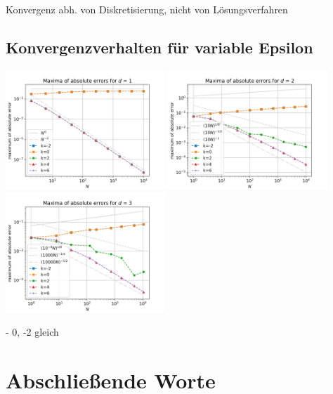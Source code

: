 \documentclass{scrartcl}
\begin{document}
Konvergenz abh. von Diskretisierung, nicht von Lösungsverfahren

\pagebreak
\subsection{Konvergenzverhalten für variable Epsilon}
{
  \centering
    \includegraphics[width=0.45\textwidth]{Grafiken/epsilon_d1}
    \includegraphics[width=0.45\textwidth]{Grafiken/epsilon_d2}
    \includegraphics[width=0.45\textwidth]{Grafiken/epsilon_d3}
    \vspace{-0.2cm}
}
\vspace{0.5cm}

- 0, -2 gleich

\pagebreak
\section{Abschließende Worte}
\end{document}
